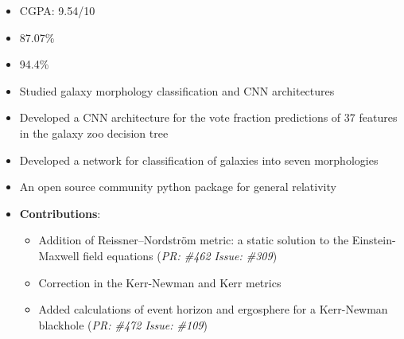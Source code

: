 \documentclass[10pt,a4paper,ragged2e,withhyper]{altacv}
\begin{document}
\begin{paracol}{2}


\switchcolumn

\begin{itemize}
    \item CGPA: 9.54/10
\end{itemize}

\begin{itemize}
    \item 87.07\%
\end{itemize}

\begin{itemize}
    \item 94.4\%
\end{itemize}

\begin{itemize}
    \item Studied galaxy morphology classification and CNN architectures
    \item Developed a CNN architecture for the vote fraction predictions of 37 features in the galaxy zoo decision tree
    \item Developed a network for classification of galaxies into seven morphologies
\end{itemize}
\begin{itemize}
    \item An open source community python package for general relativity
    \item \textbf{Contributions}:
    \begin{itemize}
        \item Addition of  Reissner–Nordström metric: a static solution to the Einstein-Maxwell field equations (\textit{PR: \#462 Issue: \#309})
        \item Correction in the Kerr-Newman and Kerr metrics
        \item Added calculations of event horizon and ergosphere for a Kerr-Newman blackhole (\textit{PR: \#472 Issue: \#109}) 
    \end{itemize}
\end{itemize}
\nocite{*}
\printbibliography[heading=pubtype,title={\printinfo{\faFile*[regular]}{Journal Articles}}, type=misc]
\end{paracol}
\end{document}
